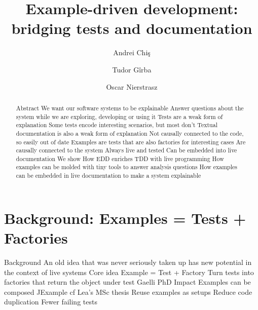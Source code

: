\documentclass[sigplan,anonymous,review,10pt]{acmart}
\begin{document}
\title{Example-driven development: \\ bridging tests and documentation}
\author{Andrei Chi\c{s}}
\author{Tudor G\^irba}
\author{Oscar Nierstrasz}

\renewcommand{\shortauthors}{Chi\c{s} et al.}

\begin{abstract}

	Abstract
		We want our software systems to be explainable
			Answer questions about the system while we are exploring, developing or using it
		Tests are a weak form of explanation
			Some tests encode interesting scenarios, but most don't
		Textual documentation is also a weak form of explanation
			Not causally connected to the code, so easily out of date
		Examples are tests that are also factories for interesting cases
			Are causally connected to the system
				Always live and tested
			Can be embedded into live documentation
		We show
			How EDD enriches TDD with live programming
			How examples can be molded with tiny tools to answer analysis questions
			How examples can be embedded in live documentation to make a system explainable

\end{abstract}



\maketitle

\section{Background: Examples = Tests + Factories}\label{sec:intro}


	Background
		An old idea that was never seriously taken up
			has new potential in the context of live systems
		Core idea
			Example = Test + Factory
			Turn tests into factories that return the object under test
			Gaelli PhD
		Impact
			Examples can be composed
				JExample
					cf Lea's MSc thesis
				Reuse examples as setups
				Reduce code duplication
				Fewer failing tests
\end{document}
